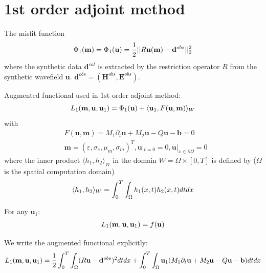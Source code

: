 \documentclass[pdftex,a4paper,parskip,listof=totoc,bibliography=totoc,onehalfspacing,12pt]{scrreprt}
\begin{document}
\section{1st order adjoint method}
\par The misfit function
\begin{equation}
 \Phi_1(\mathbf{m}) = \Phi_1(\mathbf{u}) = \frac{1}{2} || R\mathbf{u}(\mathbf{m}) - \mathbf{d}^{obs} ||_2^2 \\
\end{equation}
where the synthetic data $\mathbf{d}^{cal}$ is extracted by the restriction operator $R$ from the synthetic wavefield $\mathbf{u}$. $\mathbf{d}^{obs}=(\mathbf{H}^{obs}, \mathbf{E}^{obs})$. \\
\par Augmented functional used in 1st order adjoint method:
\begin{equation}
 L_1(\mathbf{m}, \mathbf{u},\mathbf{u}_{1}) = \Phi_1(\mathbf{u}) + \langle \mathbf{u}_{1}, F(\mathbf{u},\mathbf{m}) \rangle_W \\
\end{equation}
with
\begin{equation}
\begin{split}
\label{eqn:initialCondition1}
 & F(\mathbf{u},\mathbf{m}) = M_1 \partial_{t} \mathbf{u} + M_2 \mathbf{u} - Q\mathbf{u} - \mathbf{b} = 0 \\
 & \mathbf{m} = (\varepsilon, \sigma_e, \mu_m, \sigma_m)^T, \mathbf{u}|_{t=0} = 0, \mathbf{u}|_{x\in \partial \Omega} = 0
 \end{split}
\end{equation}
where the inner product $\langle h_1, h_2 \rangle_W$ in the domain $W=\Omega \times [0, T]$ is defined by ($\Omega$ is the spatial computation domain)\\
\begin{equation}
 \langle h_1, h_2 \rangle_W = \int_0^T \int_\Omega h_1(x,t) h_2(x,t) dt dx\\
\end{equation}
\par For any $\mathbf{u}_{1}$:
\begin{equation}
 L_1(\mathbf{m}, \mathbf{u},\mathbf{u}_{1}) = f(\mathbf{u}) \\
\end{equation}
\par We write the augmented functional explicitly:
\begin{equation}
\label{eqn:AugmentFunctional}
 L_1(\mathbf{m}, \mathbf{u},\mathbf{u}_{1}) = \frac{1}{2} \int_0^T \int_\Omega (R\mathbf{u} - \mathbf{d}^{obs})^2 dt dx + \int_0^T \int_\Omega \mathbf{u}_{1} (M_1 \partial_{t} \mathbf{u} + M_2 \mathbf{u} - Q \mathbf{u} - \mathbf{b})  dt dx\\
\end{equation}
\end{document}
